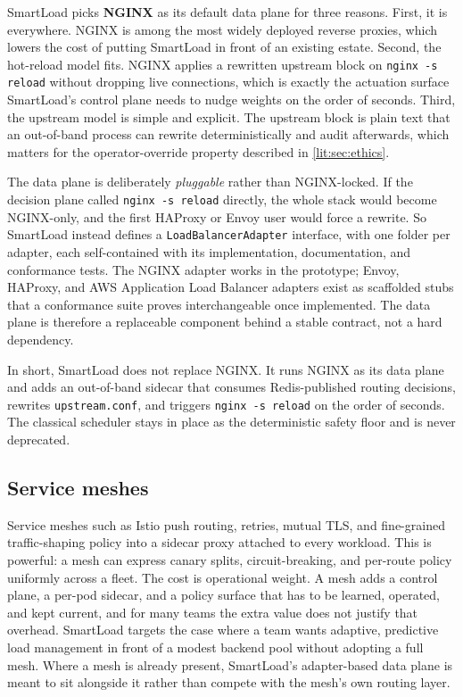 SmartLoad picks \textbf{NGINX} as its default data plane for three reasons.
First, it is everywhere. NGINX is among the most widely deployed reverse
proxies, which lowers the cost of putting SmartLoad in front of an existing
estate. Second, the hot-reload model fits. NGINX applies a rewritten upstream
block on \texttt{nginx -s reload} without dropping live connections, which is
exactly the actuation surface SmartLoad's control plane needs to nudge weights
on the order of seconds. Third, the upstream model is simple and explicit. The
upstream block is plain text that an out-of-band process can rewrite
deterministically and audit afterwards, which matters for the operator-override
property described in \cref{lit:sec:ethics}.

The data plane is deliberately \emph{pluggable} rather than NGINX-locked. If
the decision plane called \texttt{nginx -s reload} directly, the whole stack
would become NGINX-only, and the first HAProxy or Envoy user would force a
rewrite. So SmartLoad instead defines a \texttt{LoadBalancerAdapter} interface,
with one folder per adapter, each self-contained with its implementation,
documentation, and conformance tests. The NGINX adapter works in the prototype;
Envoy, HAProxy, and AWS Application Load Balancer adapters exist as scaffolded
stubs that a conformance suite proves interchangeable once implemented. The
data plane is therefore a replaceable component behind a stable contract, not a
hard dependency.

In short, SmartLoad does not replace NGINX. It runs NGINX as its data plane and
adds an out-of-band sidecar that consumes Redis-published routing decisions,
rewrites \texttt{upstream.conf}, and triggers \texttt{nginx -s reload} on the
order of seconds. The classical scheduler stays in place as the deterministic
safety floor and is never deprecated.

\subsection{Service meshes}
\label{lit:sec:market-mesh}

Service meshes such as Istio \cite{istio} push routing, retries, mutual TLS,
and fine-grained traffic-shaping policy into a sidecar proxy attached to every
workload. This is powerful: a mesh can express canary splits, circuit-breaking,
and per-route policy uniformly across a fleet. The cost is operational weight.
A mesh adds a control plane, a per-pod sidecar, and a policy surface that has to
be learned, operated, and kept current, and for many teams the extra value does
not justify that overhead. SmartLoad targets the case where a team wants
adaptive, predictive load management in front of a modest backend pool without
adopting a full mesh. Where a mesh is already present, SmartLoad's
adapter-based data plane is meant to sit alongside it rather than compete with
the mesh's own routing layer.

